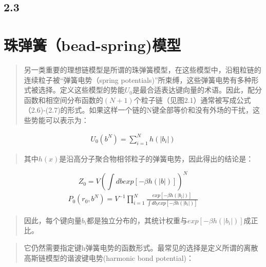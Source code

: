 \subsection{2.3}



%
			\section{珠弹簧（bead-spring)模型}
			\begin{quotation}
				另一类重要的理想链模型是所谓的珠弹簧模型，在这些模型中，沿粗粒链的连续粒子被“弹簧电势（spring potentials)”所束缚，这些弹簧电势有多种形式被选择。定义这些模型的势能$U_{0}$是最合适表达键向量的术语。因此，配分函数和相空间分布函数的$(N+1)$个粒子链（见图2.1）通常被写成公式（2.6)-(2.7)的形式。如果这样一个链的N键全部等价和没有外场的干扰，这些势能可以表示为：
			\end{quotation} 
			\begin{equation}
			\begin{split}
			U_{0}(b^{N})= \sum_{i=1}^{N}h(|b_{i}|)
			\end{split}
			\end{equation}
			\begin{quotation}
				其中$h(x)$是沿高分子聚合物相邻粒子的弹簧电势，因此得出的结论是：
			\end{quotation}
			\begin{equation}
			Z_{0}=V(\int db exp[-\beta h(|b|)])^N 
			\end{equation}
			\begin{equation}
			\begin{split}		
			P_{0} (r_{0},b^N) =V^{-1} \prod_{i=1}^{N} \frac{exp[-\beta h(|b_{i}|)]}{\int d b_{i}exp[-\beta h(|b_{i}|)]}
			\end{split}
			\end{equation}
			\begin{quotation}
				因此，每个键向量$b_{i}$都是独立分布的，其统计权重与$exp[-\beta h(|b_{i}|)]$成正比。 
			\end{quotation}
			\begin{quotation}
				它仍然需要指定键h弹簧电势的函数形式。最常见的选择是定义所谓的离散高斯链模型的谐波键电势(harmonic bond potential)： 
			\end{quotation}
